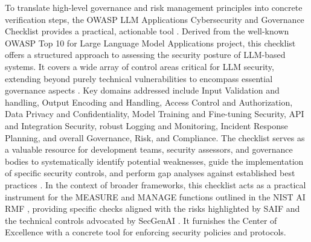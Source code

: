 To translate high-level governance and risk management principles into concrete verification steps, the OWASP LLM Applications Cybersecurity and Governance Checklist provides a practical, actionable tool \cite{OWASP:2024:LLMChecklist}. Derived from the well-known OWASP Top 10 for Large Language Model Applications project, this checklist offers a structured approach to assessing the security posture of LLM-based systems. It covers a wide array of control areas critical for LLM security, extending beyond purely technical vulnerabilities to encompass essential governance aspects \cite{OWASP:2024:LLMChecklist}. Key domains addressed include Input Validation and handling, Output Encoding and Handling, Access Control and Authorization, Data Privacy and Confidentiality, Model Training and Fine-tuning Security, API and Integration Security, robust Logging and Monitoring, Incident Response Planning, and overall Governance, Risk, and Compliance\cite{OWASP:2024:LLMChecklist}. The checklist serves as a valuable resource for development teams, security assessors, and governance bodies to systematically identify potential weaknesses, guide the implementation of specific security controls, and perform gap analyses against established best practices \cite{OWASP:2024:LLMChecklist}. In the context of broader frameworks, this checklist acts as a practical instrument for the MEASURE and MANAGE functions outlined in the NIST AI RMF \cite{tabassi_artificial_2023}, providing specific checks aligned with the risks highlighted by SAIF \cite{hansen_introducing_2023} and the technical controls advocated by SecGenAI \cite{haryanto_secgenai_2024}. It furnishes the  Center of Excellence\cite{OWASP:2024:LLMChecklist} with a concrete tool for enforcing security policies and protocols.

